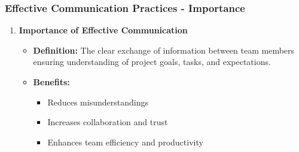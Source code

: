 \documentclass[aspectratio=169]{beamer}
\begin{document}
\begin{frame}[fragile]
    \frametitle{Effective Communication Practices - Importance}
    \begin{enumerate}
        \item \textbf{Importance of Effective Communication}
            \begin{itemize}
                \item \textbf{Definition:} The clear exchange of information between team members ensuring understanding of project goals, tasks, and expectations.
                \item \textbf{Benefits:}
                    \begin{itemize}
                        \item Reduces misunderstandings
                        \item Increases collaboration and trust
                        \item Enhances team efficiency and productivity
                    \end{itemize}
            \end{itemize}
    \end{enumerate}
\end{frame}
\end{document}

